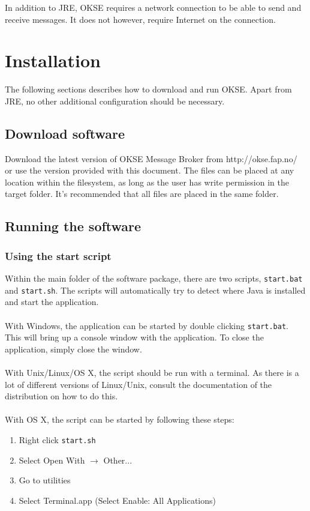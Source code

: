 In addition to JRE, OKSE requires a network connection to be able to send and receive messages. It does not however, require Internet on the connection. 

\section{Installation}
\label{Installation_okse}

The following sections describes how to download and run OKSE. Apart from JRE, no other additional configuration should be necessary.

\subsection{Download software}

Download the latest version of OKSE Message Broker from http://okse.fap.no/ or use the version provided with this document. The files can be placed at any location within the filesystem, as long as the user has write permission in the target folder. It's recommended that all files are placed in the same folder.

\subsection{Running the software}

\subsubsection{Using the start script}
Within the main folder of the software package, there are two scripts, \verb!start.bat! and \verb!start.sh!. The scripts will automatically try to detect where Java is installed and start the application.\\\\With Windows, the application can be started by double clicking \verb!start.bat!. This will bring up a console window with the application. To close the application, simply close the window.\\\\With Unix/Linux/OS X, the script should be run with a terminal. As there is a lot of different versions of Linux/Unix, consult the documentation of the distribution on how to do this.\\\\With OS X, the script can be started by following these steps:

\begin{enumerate}
\item Right click \verb!start.sh!
\item Select Open With $\rightarrow$ Other...
\item Go to utilities
\item Select Terminal.app (Select Enable: All Applications)
\end{enumerate}

